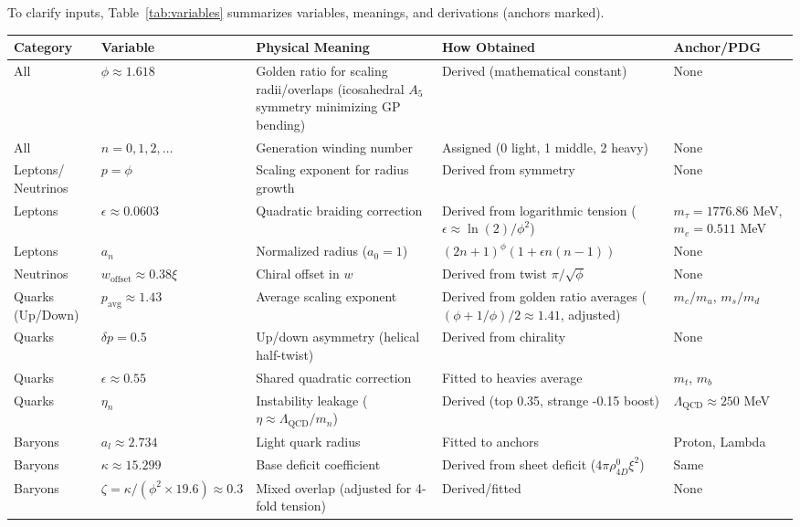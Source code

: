 \documentclass{article}
\begin{document}
To clarify inputs, Table~\ref{tab:variables} summarizes variables, meanings, and derivations (anchors marked).

\begin{sidewaystable}[p]
\centering
\begin{tabular}{|p{2cm}|p{3cm}|p{6cm}|p{6cm}|p{3cm}|}
\hline
Category & Variable & Physical Meaning & How Obtained & Anchor/PDG \\
\hline
All & $\phi \approx 1.618$ & Golden ratio for scaling radii/overlaps (icosahedral $A_5$ symmetry minimizing GP bending) & Derived (mathematical constant) & None \\
All & $n = 0,1,2,\dots$ & Generation winding number & Assigned (0 light, 1 middle, 2 heavy) & None \\
Leptons/ Neutrinos & $p = \phi$ & Scaling exponent for radius growth & Derived from symmetry & None \\
Leptons & $\epsilon \approx 0.0603$ & Quadratic braiding correction & Derived from logarithmic tension ($\epsilon \approx \ln(2)/\phi^2$) & $m_\tau=1776.86$ MeV, $m_e=0.511$ MeV \\
Leptons & $a_n$ & Normalized radius ($a_0=1$) & $(2n+1)^\phi (1 + \epsilon n(n-1))$ & None \\
Neutrinos & $w_{\text{offset}} \approx 0.38 \xi$ & Chiral offset in $w$ & Derived from twist $\pi / \sqrt{\phi}$ & None \\
Quarks (Up/Down) & $p_{\text{avg}} \approx 1.43$ & Average scaling exponent & Derived from golden ratio averages ($(\phi + 1/\phi)/2 \approx 1.41$, adjusted) & $m_c/m_u$, $m_s/m_d$ \\
Quarks & $\delta p = 0.5$ & Up/down asymmetry (helical half-twist) & Derived from chirality & None \\
Quarks & $\epsilon \approx 0.55$ & Shared quadratic correction & Fitted to heavies average & $m_t$, $m_b$ \\
Quarks & $\eta_n$ & Instability leakage ($\eta \approx \Lambda_{\text{QCD}} / m_n$) & Derived (top 0.35, strange -0.15 boost) & $\Lambda_{\text{QCD}} \approx 250$ MeV \\
Baryons & $a_l \approx 2.734$ & Light quark radius & Fitted to anchors & Proton, Lambda \\
Baryons & $\kappa \approx 15.299$ & Base deficit coefficient & Derived from sheet deficit ($4 \pi \rho_{4D}^0 \xi^2$) & Same \\
Baryons & $\zeta = \kappa / (\phi^2 \times 19.6) \approx 0.3$ & Mixed overlap (adjusted for 4-fold tension) & Derived/fitted & None \\

\end{tabular}
\end{sidewaystable}
\end{document}
